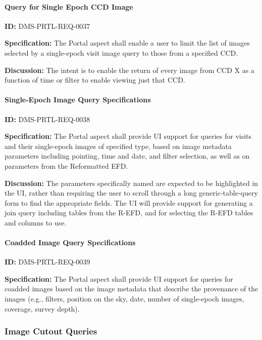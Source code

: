 \documentclass[SE,toc,lsstdraft]{lsstdoc}
\begin{document}
\paragraph{Query for Single Epoch CCD Image}\hfill  %

\label{DMS-PRTL-REQ-0037}
\textbf{ID:} DMS-PRTL-REQ-0037

\textbf{Specification:}
The Portal aspect shall enable a user to limit the list of images selected by a single-epoch visit image query to those from a specified CCD.

\textbf{Discussion:}
The intent is to enable the return of every image from CCD X as a function of time or filter to enable viewing just that CCD.

\paragraph{Single-Epoch Image Query Specifications}\hfill  %

\label{DMS-PRTL-REQ-0038}
\textbf{ID:} DMS-PRTL-REQ-0038

\textbf{Specification:}
The Portal aspect shall provide UI support for queries for visits and their single-epoch images of specified type, based on image metadata parameters including pointing, time and date, and filter selection, as well as on parameters from the Reformatted EFD.

\textbf{Discussion:}
The parameters specifically named are expected to be highlighted in the UI, rather than requiring the user to scroll through a long generic-table-query form to find the appropriate fields.  The UI will provide support for generating a join query including tables from the R-EFD, and for selecting the R-EFD tables and columns to use.

\paragraph{Coadded Image Query Specifications}\hfill  %

\label{DMS-PRTL-REQ-0039}
\textbf{ID:} DMS-PRTL-REQ-0039

\textbf{Specification:}
The Portal aspect shall provide UI support for queries for coadded images based on the image metadata that describe the provenance of the images (e.g., filters, position on the sky, date, number of single-epoch images, coverage, survey depth).

\subsubsection{Image Cutout Queries}
\end{document}
